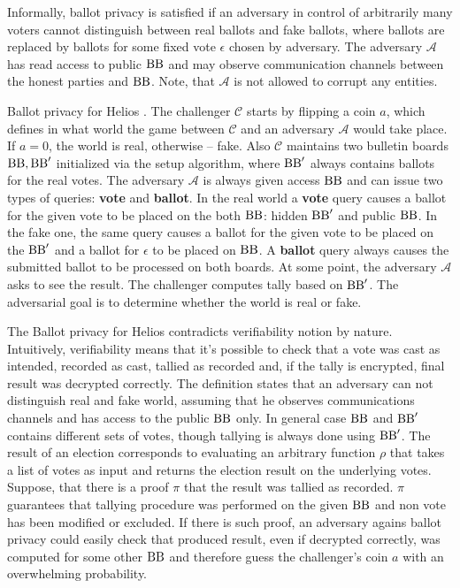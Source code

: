 Informally, ballot privacy is satisfied if an adversary in control of arbitrarily many voters cannot distinguish between real ballots and fake ballots, where ballots are replaced by ballots for some fixed vote $\epsilon$ chosen by adversary. The adversary $\mathcal{A}$ has read access to public $\operatorname{BB}$ and may observe communication channels between the honest parties and $\operatorname{BB}$. Note, that $\mathcal{A}$  is not allowed to corrupt any entities. \\

\theoremstyle{definition}
\begin{definition}{Ballot privacy for Helios \cite{Bernhard2011}.}
The challenger $\mathcal{C}$ starts by flipping a coin $a$, which defines in what world the game between $\mathcal{C}$ and an adversary  $\mathcal{A}$ would take place.  If $a=0$, the world is real, otherwise -- fake. Also $\mathcal{C}$  maintains two bulletin boards $\operatorname{BB},\operatorname{BB}'$ initialized via the setup algorithm, where $\operatorname{BB}'$ always contains ballots for the real votes.  The adversary $\mathcal{A}$ is always given access $\operatorname{BB}$ and can issue two types of queries: \textbf{vote} and \textbf{ballot}.  In the real world a \textbf{vote} query causes a ballot for the given vote to be placed on the both $\operatorname{BB}$: hidden $\operatorname{BB}'$ and public $\operatorname{BB}$. In the fake one, the same query causes a ballot for the given vote to be placed on the $\operatorname{BB}'$ and a ballot for $\epsilon$  to be placed on $\operatorname{BB}$. A \textbf{ballot} query always causes the submitted ballot to be processed on both boards. At some point, the adversary $\mathcal{A}$ asks to see the result. The challenger computes tally based on $\operatorname{BB}'$. The adversarial goal is to determine whether the world is real or fake.\\
\end{definition}

The Ballot privacy for Helios contradicts verifiability notion by nature. Intuitively, verifiability means that it's possible to check that a vote was cast as intended, recorded as cast, tallied as recorded and, if the tally is encrypted, final result was decrypted correctly. The definition states that an adversary can not distinguish real and fake world, assuming that he observes communications channels and has access to the public $\operatorname{BB}$ only. In general case $\operatorname{BB}$ and $\operatorname{BB}'$ contains different sets of votes, though tallying is always done using $\operatorname{BB}'$. The result of an election corresponds to evaluating an arbitrary function $\rho$ that takes a list of votes as input and returns the election result on the underlying votes. Suppose, that there is a proof $\pi$ that the result was tallied as recorded. $\pi$ guarantees that tallying procedure was performed on the given $\operatorname{BB}$ and non vote has been modified or excluded. If there is such proof, an adversary agains ballot privacy could easily check that produced result, even if decrypted correctly, was computed for some other $\operatorname{BB}$ and therefore guess the challenger's coin $a$ with an overwhelming probability. \\

